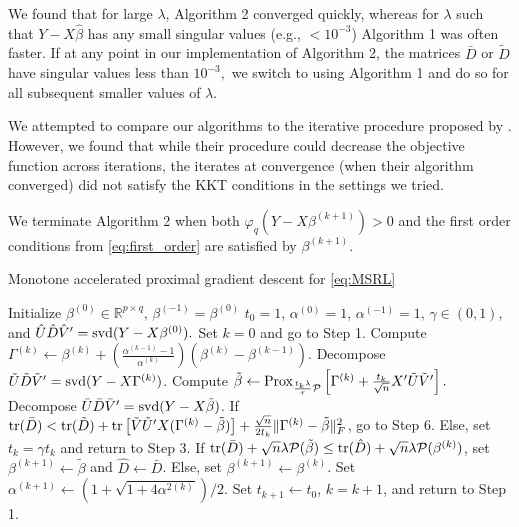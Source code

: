 \documentclass[12pt]{article}
\begin{document}
We found that for large $\lambda$, Algorithm 2 converged quickly, whereas for $\lambda$ such that $Y - X\hat{\beta}$ has any small singular values (e.g., $ < 10^{-3}$) Algorithm 1 was often faster. If at any point in our implementation of Algorithm 2, the matrices $\bar{D}$ or $\tilde{D}$ have singular values less than $10^{-3},$ we switch to using Algorithm 1 and do so for all subsequent smaller values of $\lambda$. 

We attempted to compare our algorithms to the iterative procedure proposed by \citet{van2016chi2}. However, we found that while their procedure could decrease the objective function across iterations, the iterates at convergence (when their algorithm converged) did not satisfy the KKT conditions in the settings we tried. 

We terminate Algorithm 2 when both $\varphi_q(Y - X \beta^{(k+1)}) > 0$ and the first order conditions from \eqref{eq:first_order}
are satisfied by $\beta^{(k+1)}$.

\begin{algorithm}
\caption{Monotone accelerated proximal gradient descent for \eqref{eq:MSRL}}
\begin{spacing}{1.15}
\begin{algorithmic}[1]
\Require Initialize $\beta^{(0)} \in \mathbb{R}^{p \times q}$, $\beta^{(-1)} = \beta^{(0)}$ $t_0=1$, $\alpha^{(0)} = 1$, $\alpha^{(-1)} = 1$, $\gamma \in (0,1)$, and $\hat{U}\hat{D}\hat{V}' = {\rm svd}(Y - X \beta^{(0)}).$ Set $k=0$ and go to Step 1. 
\State Compute $\Gamma^{(k)} \leftarrow \beta^{(k)} + \left(\frac{\alpha^{(k-1)} - 1}{\alpha^{(k)}}\right) \left(\beta^{(k)} - \beta^{(k-1)}\right).$
\State Decompose $\tilde{U}\tilde{D}\tilde{V}' = {\rm svd}(Y - X \Gamma^{(k)})$.
	\State Compute $\tilde{\beta} \leftarrow {\rm Prox}_{ \frac{t_k\lambda}{\tau} \mathcal{P}} \left[\Gamma^{(k)} + \frac{t_k}{\sqrt{n}}X'\tilde{U}\tilde{V}' \right].$
	\State Decompose $\bar{U}\bar{D}\bar{V}' = {\rm svd}(Y - X\tilde{\beta})$. 
 	\State If ${\rm tr}(\bar{D})  < {\rm tr}(\tilde{D}) + 
 	{\rm tr}\left[\tilde{V}\tilde{U}'X(\Gamma^{(k)} - \tilde{\beta})\right] + \frac{\sqrt{n}}{2t_k}\|\Gamma^{(k)} - \tilde{\beta}\|_F^2$, go to Step 6. Else, set $t_k = \gamma t_k$ and return to Step 3.
 	\State If ${\rm tr}(\bar{D}) + \sqrt{n}\lambda \mathcal{P}(\tilde{\beta}) \leq {\rm tr}(\hat{D}) + \sqrt{n}\lambda \mathcal{P}(\beta^{(k)})$, set $\beta^{(k+1)} \leftarrow \tilde{\beta}$ and $\hat{D} \leftarrow \bar{D}$. Else, set $\beta^{(k+1)} \leftarrow \beta^{(k)}$. 
 	\State Set $\alpha^{(k+1)} \leftarrow (1 + \sqrt{1 + 4\alpha^{2(k)}})/2.$ 
	\State Set $t_{k+1} \leftarrow t_0$, $k = k + 1$, and return to Step 1. 
\end{algorithmic}
\end{spacing}
\end{algorithm}
\end{document}
